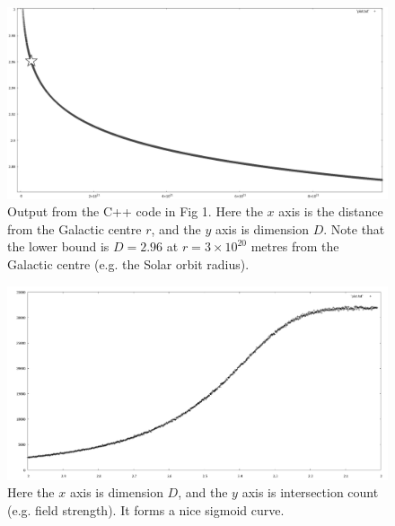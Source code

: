 \documentclass[12pt]{article}
\begin{document}
\begin{figure} 
\centering
  \includegraphics[width = 5 in]{dimension_graph.png}
  \caption{ Output from the C++ code in Fig 1.
Here the $x$ axis is the distance from the Galactic centre $r$, and the $y$ axis is dimension $D$.
Note that the lower bound is $D = 2.96$ at $r = 3 \times 10^{20}$ metres from the Galactic centre (e.g. the Solar orbit radius).
}
\end{figure}










\begin{figure} 
\centering
  \includegraphics[width = 5 in]{transition.png}
  \caption{
Here the $x$ axis is dimension $D$, and the $y$ axis is intersection count (e.g. field strength).
It forms a nice sigmoid curve.
}
\end{figure}
\end{document}
